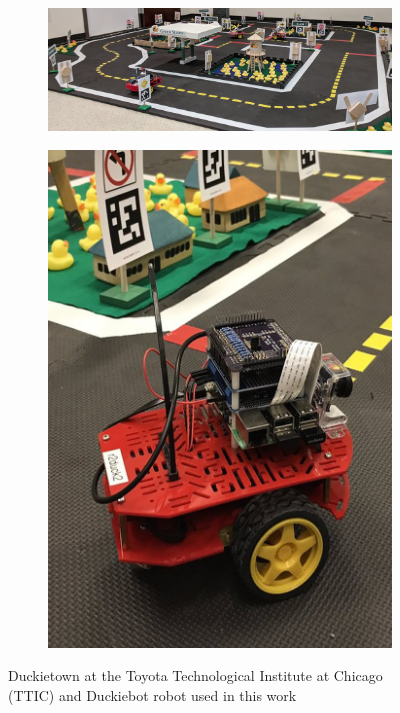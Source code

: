 \begin{figure}[t]
	\begin{subfigure}{0.78\textwidth}
		\centering
		\includegraphics[width=\textwidth]{figures/duckietown.jpg}
	    \vspace{-12pt}
	    \caption{\label{fig:duckietown}}
	\end{subfigure}
	\begin{subfigure}{0.193\textwidth}
		\centering
		\includegraphics[width=\textwidth]{figures/duckiebot.jpg}
		\caption{\label{fig:duckiebot}}
	\end{subfigure}
	\caption{Duckietown at the Toyota Technological Institute at Chicago (TTIC) and Duckiebot robot used in this work}
	\label{fig:test-bed}
\end{figure}

